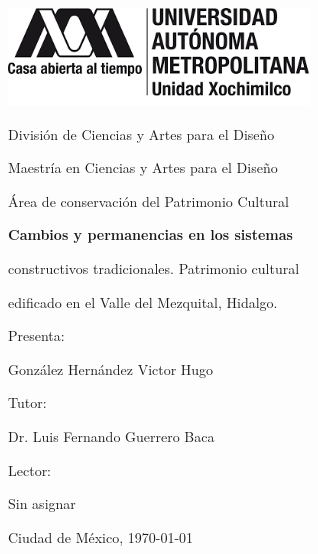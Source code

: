 \begin{titlepage}

	{\includegraphics[width=0.6\textwidth]{./imagenes/logo_uam/logo_completo.png}\par}
	\vspace{0.5cm}
	{\large División de Ciencias y Artes para el Diseño\par}
	{\small Maestría en Ciencias y Artes para el Diseño\par}
	{\small Área de conservación del Patrimonio Cultural\par}
	\vspace{1.5cm}
	{\bfseries \Large Cambios y permanencias en los sistemas\par constructivos tradicionales. Patrimonio cultural\par edificado en el Valle del Mezquital, Hidalgo.\par}
	\vspace{1.5cm}
	{\small Presenta:\par}
	{González Hernández Victor Hugo\par}
	{\small Tutor:\par}
	{Dr. Luis Fernando Guerrero Baca\par}
	{\small Lector:\par}
	{Sin asignar\par}
	\vspace{1cm}
	{\small Ciudad de México, \today \par}

\end{titlepage}
